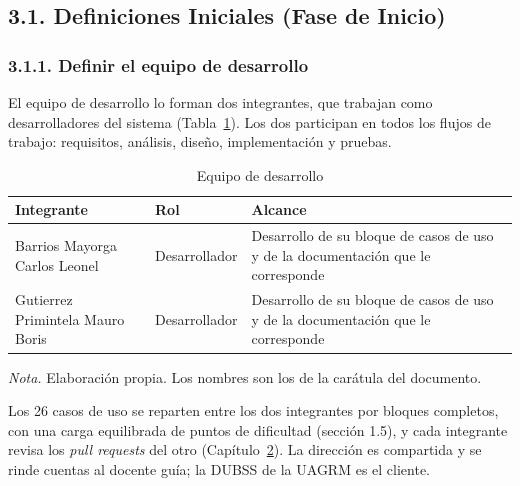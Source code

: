 
\subsection{3.1. Definiciones Iniciales (Fase de Inicio)}

\subsubsection{3.1.1. Definir el equipo de desarrollo}

El equipo de desarrollo lo forman dos integrantes, que trabajan como desarrolladores del sistema (Tabla~\ref{tab:equipo_desarrollo}). Los dos participan en todos los flujos de trabajo: requisitos, análisis, diseño, implementación y pruebas.

\begin{table}[H]
\centering
\caption{Equipo de desarrollo}
\label{tab:equipo_desarrollo}
\small
\begin{tabular}{@{}>{\raggedright\arraybackslash}p{6.2cm}>{\raggedright\arraybackslash}p{3.2cm}>{\raggedright\arraybackslash}p{5.0cm}@{}}
\toprule
\textbf{Integrante} & \textbf{Rol} & \textbf{Alcance} \\
\midrule
Barrios Mayorga Carlos Leonel & Desarrollador & Desarrollo de su bloque de casos de uso y de la documentación que le corresponde \\
Gutierrez Primintela Mauro Boris & Desarrollador & Desarrollo de su bloque de casos de uso y de la documentación que le corresponde \\
\bottomrule
\end{tabular}

\vspace{2pt}
\footnotesize\textit{Nota.} Elaboración propia. Los nombres son los de la carátula del documento.
\end{table}

Los 26 casos de uso se reparten entre los dos integrantes por bloques completos, con una carga equilibrada de puntos de dificultad (sección 1.5), y cada integrante revisa los \textit{pull requests} del otro (Capítulo~\hyperref[cap:sqap]{2}). La dirección es compartida y se rinde cuentas al docente guía; la DUBSS de la UAGRM es el cliente.

